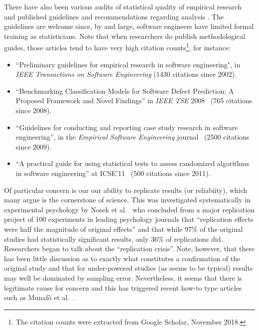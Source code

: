 \documentclass[10pt]{elsarticle}
\newcommand{\bi}{\begin{itemize}}
\newcommand{\ei}{\end{itemize}}
\begin{document}
There have also been various audits of statistical quality of empirical research \cite{Kitc02} and published guidelines and recommendations regarding analysis \cite{Kitc02,Wohl12}. The guidelines are welcome since, by and large, software engineers have limited formal training as statisticians.  Note that when researchers do publish methodological guides, those articles tend to have very high citation counts\footnote{The citation counts were extracted from Google Scholar, November 2018.}, for instance:
\bi
\item ``Preliminary guidelines for empirical research in software engineering", in \textit{IEEE Transactions on Software Engineering} \cite{Kitc02} (1430 citations since 2002).
\item ``Benchmarking Classification Models for Software Defect Prediction: A Proposed Framework and Novel Findings'' in \textit{IEEE TSE} 2008~\cite{Lessmann08} (765 citations since 2008).
\item
``Guidelines for conducting and reporting case study research in software engineering'', 
  in the \textit{Empirical Software Engineering} journal~\cite{runeson2009guidelines} (2500 citations since 2009).
\item ``A practical guide for using statistical tests to assess randomized algorithms in software engineering'' at ICSE'11~\cite{Arcuri:2011} (500 citations since 2011).
\ei

Of particular concern is our our ability to replicate results (or reliabiity), which many argue is the cornerstone of science.  This was investigated systematically in experimental psychology by Nosek et al.~\cite{Open15} who concluded from a major replication project of 100 experiments in leading psychology journals that ``replication effects were half the magnitude of original effects'' and that while 97\% of the original studies had statistically significant results, only 36\% of replications did.  Researchers began to talk about the ``replication crisis''.  Note, however, that there has been little discussion as to exactly what constitutes a confirmation of the original study \cite{Spen16} and that for under-powered studies (as seems to be typical) results may well be dominated by sampling error.  Nevertheless, it seems that there is legitimate cause for concern and this has triggered recent how-to type articles such as Munaf{\`o} et al.~\cite{Muna17}.
\end{document}

